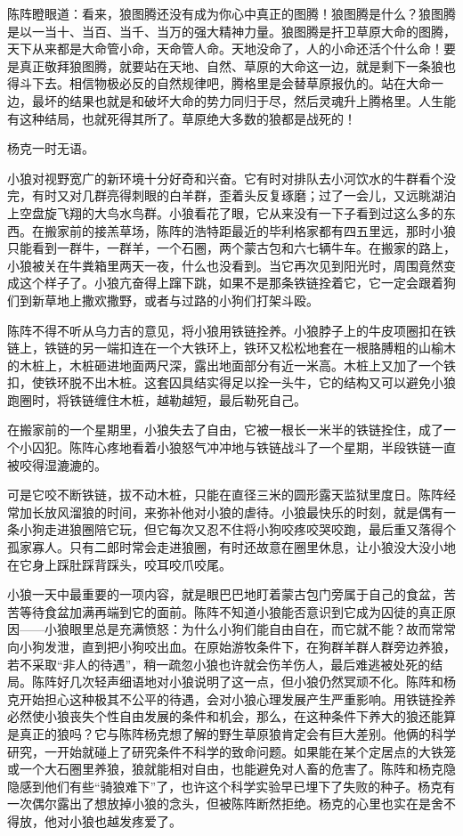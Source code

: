 \par 陈阵瞪眼道：看来，狼图腾还没有成为你心中真正的图腾！狼图腾是什么？狼图腾是以一当十、当百、当千、当万的强大精神力量。狼图腾是扞卫草原大命的图腾，天下从来都是大命管小命，天命管人命。天地没命了，人的小命还活个什么命！要是真正敬拜狼图腾，就要站在天地、自然、草原的大命这一边，就是剩下一条狼也得斗下去。相信物极必反的自然规律吧，腾格里是会替草原报仇的。站在大命一边，最坏的结果也就是和破坏大命的势力同归于尽，然后灵魂升上腾格里。人生能有这种结局，也就死得其所了。草原绝大多数的狼都是战死的！
\par 杨克一时无语。
\par 小狼对视野宽广的新环境十分好奇和兴奋。它有时对排队去小河饮水的牛群看个没完，有时又对几群亮得刺眼的白羊群，歪着头反复琢磨；过了一会儿，又远眺湖泊上空盘旋飞翔的大鸟水鸟群。小狼看花了眼，它从来没有一下子看到过这么多的东西。在搬家前的接羔草场，陈阵的浩特距最近的毕利格家都有四五里远，那时小狼只能看到一群牛，一群羊，一个石圈，两个蒙古包和六七辆牛车。在搬家的路上，小狼被关在牛粪箱里两天一夜，什么也没看到。当它再次见到阳光时，周围竟然变成这个样子了。小狼亢奋得上蹿下跳，如果不是那条铁链拴着它，它一定会跟着狗们到新草地上撒欢撒野，或者与过路的小狗们打架斗殴。
\par 陈阵不得不听从乌力吉的意见，将小狼用铁链拴养。小狼脖子上的牛皮项圈扣在铁链上，铁链的另一端扣连在一个大铁环上，铁环又松松地套在一根胳膊粗的山榆木的木桩上，木桩砸进地面两尺深，露出地面部分有近一米高。木桩上又加了一个铁扣，使铁环脱不出木桩。这套囚具结实得足以拴一头牛，它的结构又可以避免小狼跑圈时，将铁链缠住木桩，越勒越短，最后勒死自己。
\par 在搬家前的一个星期里，小狼失去了自由，它被一根长一米半的铁链拴住，成了一个小囚犯。陈阵心疼地看着小狼怒气冲冲地与铁链战斗了一个星期，半段铁链一直被咬得湿漉漉的。
\par 可是它咬不断铁链，拔不动木桩，只能在直径三米的圆形露天监狱里度日。陈阵经常加长放风溜狼的时间，来弥补他对小狼的虐待。小狼最快乐的时刻，就是偶有一条小狗走进狼圈陪它玩，但它每次又忍不住将小狗咬疼咬哭咬跑，最后重又落得个孤家寡人。只有二郎时常会走进狼圈，有时还故意在圈里休息，让小狼没大没小地在它身上踩肚踩背踩头，咬耳咬爪咬尾。
\par 小狼一天中最重要的一项内容，就是眼巴巴地盯着蒙古包门旁属于自己的食盆，苦苦等待食盆加满再端到它的面前。陈阵不知道小狼能否意识到它成为囚徒的真正原因——小狼眼里总是充满愤怒：为什么小狗们能自由自在，而它就不能？故而常常向小狗发泄，直到把小狗咬出血。在原始游牧条件下，在狗群羊群人群旁边养狼，若不采取“非人的待遇”，稍一疏忽小狼也许就会伤羊伤人，最后难逃被处死的结局。陈阵好几次轻声细语地对小狼说明了这一点，但小狼仍然冥顽不化。陈阵和杨克开始担心这种极其不公平的待遇，会对小狼心理发展产生严重影响。用铁链拴养必然使小狼丧失个性自由发展的条件和机会，那么，在这种条件下养大的狼还能算是真正的狼吗？它与陈阵杨克想了解的野生草原狼肯定会有巨大差别。他俩的科学研究，一开始就碰上了研究条件不科学的致命问题。如果能在某个定居点的大铁笼或一个大石圈里养狼，狼就能相对自由，也能避免对人畜的危害了。陈阵和杨克隐隐感到他们有些“骑狼难下”了，也许这个科学实验早已埋下了失败的种子。杨克有一次偶尔露出了想放掉小狼的念头，但被陈阵断然拒绝。杨克的心里也实在是舍不得放，他对小狼也越发疼爱了。
